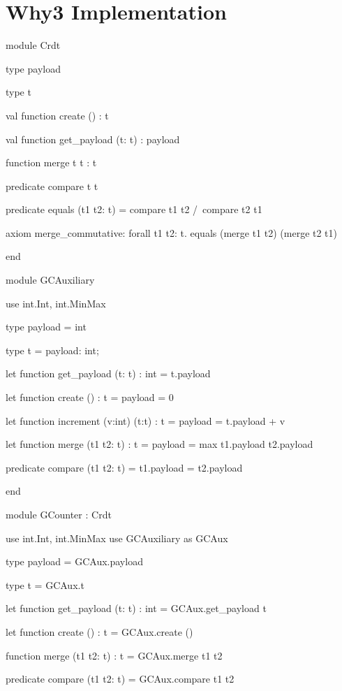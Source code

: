 %


\chapter{Why3 Implementation}
\label{app:why3_implementation}

\begin{Why3}
module Crdt

  type payload

  type t

  val function create () : t

  val function get_payload (t: t) : payload

  function merge t t : t

  predicate compare t t

  predicate equals (t1 t2: t)
  = compare t1 t2 /\ compare t2 t1

  axiom merge_commutative: forall t1 t2: t.
    equals (merge t1 t2) (merge t2 t1)

end

module GCAuxiliary

  use int.Int, int.MinMax

  type payload = int

  type t = { payload: int; }

  let function get_payload (t: t) : int
  = t.payload

  let function create () : t
  = { payload = 0 }

  let function increment (v:int) (t:t) : t =
    { payload = t.payload + v }

  let function merge (t1 t2: t) : t =
    { payload = max t1.payload t2.payload }

  predicate compare (t1 t2: t)
  = t1.payload = t2.payload

end

module GCounter : Crdt

  use int.Int, int.MinMax
  use GCAuxiliary as GCAux

  type payload = GCAux.payload

  type t = GCAux.t

  let function get_payload (t: t) : int
  = GCAux.get_payload t

  let function create () : t
  = GCAux.create ()

  function merge (t1 t2: t) : t
  = GCAux.merge t1 t2

  predicate compare (t1 t2: t)
  = GCAux.compare t1 t2


\end{Why3}
